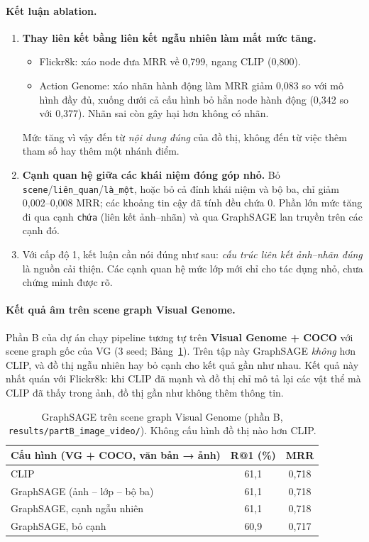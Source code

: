 \documentclass[11pt,a4paper]{article}
\begin{document}
\paragraph{Kết luận ablation.}
\begin{enumerate}
  \item \textbf{Thay liên kết bằng liên kết ngẫu nhiên làm mất mức tăng.}
  \begin{itemize}
    \item Flickr8k: xáo node đưa MRR về 0,799, ngang CLIP (0,800).
    \item Action Genome: xáo nhãn hành động làm MRR giảm 0,083 so với mô hình đầy đủ, xuống dưới cả cấu hình bỏ hẳn node hành động (0,342 so với 0,377). Nhãn sai còn gây hại hơn không có nhãn.
  \end{itemize}
  Mức tăng vì vậy đến từ \emph{nội dung đúng} của đồ thị, không đến từ việc thêm tham số hay thêm một nhánh điểm.
  \item \textbf{Cạnh quan hệ giữa các khái niệm đóng góp nhỏ.} Bỏ \texttt{scene}/\texttt{liên\_quan}/\texttt{là\_một}, hoặc bỏ cả đỉnh khái niệm và bộ ba, chỉ giảm 0,002–0,008 MRR; các khoảng tin cậy đã tính đều chứa 0. Phần lớn mức tăng đi qua cạnh \texttt{chứa} (liên kết ảnh–nhãn) và qua GraphSAGE lan truyền trên các cạnh đó.
  \item Với cấp độ 1, kết luận cần nói đúng như sau: \emph{cấu trúc liên kết ảnh–nhãn đúng} là nguồn cải thiện. Các cạnh quan hệ mức lớp mới chỉ cho tác dụng nhỏ, chưa chứng minh được rõ.
\end{enumerate}

\paragraph{Kết quả âm trên scene graph Visual Genome.}
Phần B của dự án chạy pipeline tương tự trên \textbf{Visual Genome + COCO} với scene graph gốc của VG (3 seed; Bảng~\ref{tab:vg}). Trên tập này GraphSAGE \emph{không} hơn CLIP, và đồ thị ngẫu nhiên hay bỏ cạnh cho kết quả gần như nhau. Kết quả này nhất quán với Flickr8k: khi CLIP đã mạnh và đồ thị chỉ mô tả lại các vật thể mà CLIP đã thấy trong ảnh, đồ thị gần như không thêm thông tin.

\begin{table}[H]
\centering\small
\begin{tabular}{lcc}
\toprule
\textbf{Cấu hình (VG + COCO, văn bản → ảnh)} & \textbf{R@1 (\%)} & \textbf{MRR} \\
\midrule
CLIP & 61,1 & 0,718 \\
GraphSAGE (ảnh – lớp – bộ ba) & 61,1 & 0,718 \\
GraphSAGE, cạnh ngẫu nhiên & 61,1 & 0,718 \\
GraphSAGE, bỏ cạnh & 60,9 & 0,717 \\
\bottomrule
\end{tabular}
\caption{GraphSAGE trên scene graph Visual Genome (phần B, \texttt{results/partB\_image\_video/}). Không cấu hình đồ thị nào hơn CLIP.}
\label{tab:vg}
\end{table}
\end{document}
